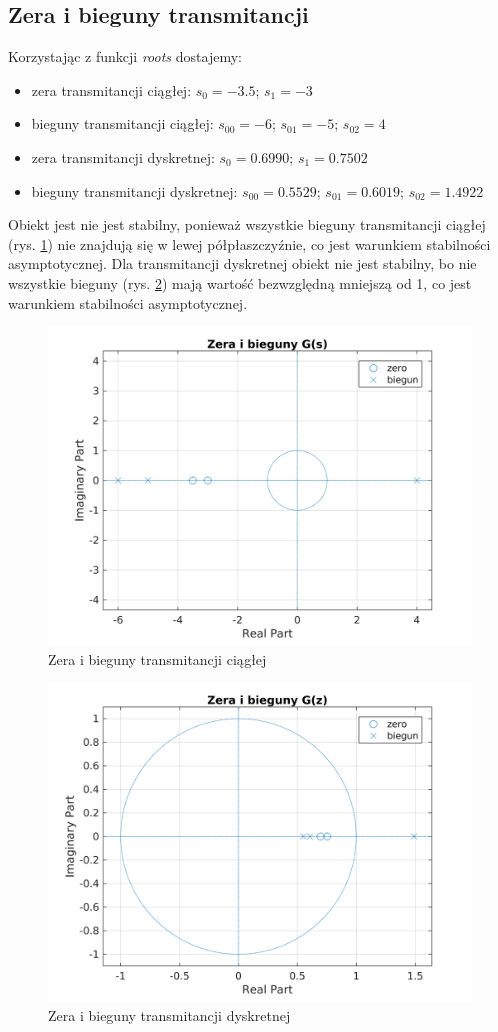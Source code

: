 \documentclass{article}
\begin{document}
\subsection{Zera i bieguny transmitancji}
Korzystając z funkcji \textit{roots} dostajemy:
\begin{itemize}
\item zera transmitancji ciągłej: $s_0=-3.5$; $s_1=-3$
\item bieguny transmitancji ciągłej: $s_{00}=-6$; $s_{01}=-5$; $s_{02}=4$
\item zera transmitancji dyskretnej: $s_0=0.6990$; $s_1=0.7502$
\item bieguny transmitancji dyskretnej: $s_{00}=0.5529$; $s_{01}=0.6019$; $s_{02}=1.4922$
\end{itemize}
Obiekt jest nie jest stabilny, ponieważ wszystkie bieguny transmitancji ciągłej (rys. \ref{fig:gs}) nie znajdują się w lewej półpłaszczyźnie, co jest warunkiem stabilności asymptotycznej. Dla transmitancji dyskretnej obiekt nie jest stabilny, bo nie wszystkie bieguny (rys. \ref{fig:gz}) mają wartość bezwzględną mniejszą od 1, co jest warunkiem stabilności asymptotycznej.
\begin{figure}
\centering
\includegraphics[width=0.7\linewidth]{zad1/G_s}
\caption{Zera i bieguny transmitancji ciągłej}
\label{fig:gs}
\end{figure}
\begin{figure}
\centering
\includegraphics[width=0.7\linewidth]{zad1/G_z}
\caption{Zera i bieguny transmitancji dyskretnej}
\label{fig:gz}
\end{figure}
\end{document}
